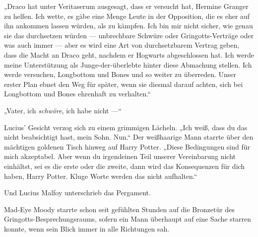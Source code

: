 „Draco hat unter Veritaserum ausgesagt, dass er versucht hat, Hermine Granger zu helfen. Ich wette, es gäbe eine Menge Leute in der Opposition, die es eher auf ihn ankommen lassen würden, als zu kämpfen. Ich bin mir nicht sicher, wie genau sie das durchsetzen würden — unbrechbare Schwüre oder Gringotts-Verträge oder was auch immer — aber es wird eine Art von durchsetzbarem Vertrag geben, dass die Macht an Draco geht, nachdem er Hogwarts abgeschlossen hat. Ich werde meine Unterstützung als Junge-der-überlebte hinter diese Abmachung stellen. Ich werde versuchen, Longbottom und Bones und so weiter zu überreden. Unser erster Plan ebnet den Weg für später, wenn sie diesmal darauf achten, sich bei Longbottom und Bones ehrenhaft zu verhalten.“

„Vater, ich \emph{schwöre}, ich habe nicht —“

Lucius’ Gesicht verzog sich zu einem grimmigen Lächeln.
„Ich weiß, dass du das nicht beabsichtigt hast, mein Sohn. Nun.“
Der weißhaarige Mann starrte über den mächtigen goldenen Tisch hinweg auf Harry Potter.
„Diese Bedingungen sind für mich akzeptabel. Aber wenn du irgendeinen Teil unserer Vereinbarung nicht einhältst, sei es die erste oder die zweite, dann wird das Konsequenzen für dich haben, Harry Potter. Kluge Worte werden das nicht aufhalten.“

Und Lucius Malfoy unterschrieb das Pergament.

\later

Mad-Eye Moody starrte schon seit gefühlten Stunden auf die Bronzetür des Gringotts-Besprechungsraums, sofern ein Mann überhaupt auf eine Sache starren konnte, wenn sein Blick immer in alle Richtungen sah.

